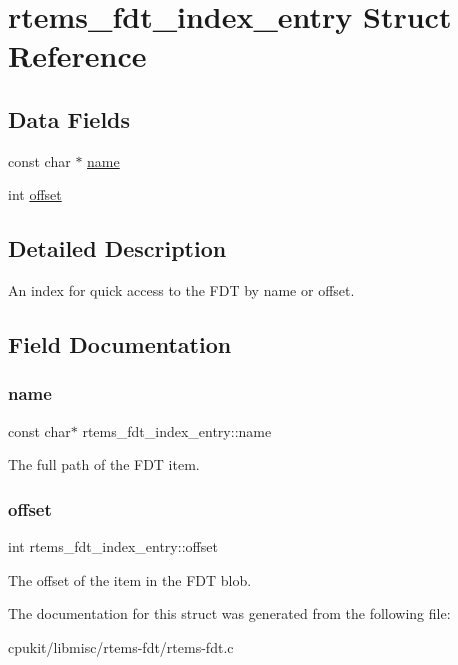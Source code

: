 \hypertarget{structrtems__fdt__index__entry}{}\section{rtems\+\_\+fdt\+\_\+index\+\_\+entry Struct Reference}
\label{structrtems__fdt__index__entry}
\subsection*{Data Fields}
\begin{DoxyCompactItemize}
\item 
const char $\ast$ \mbox{\hyperlink{structrtems__fdt__index__entry_a1febee4df5f0bf2de0d8f98c30c1e66d}{name}}
\item 
int \mbox{\hyperlink{structrtems__fdt__index__entry_af157b09672630f5f87007a166f9fbcb3}{offset}}
\end{DoxyCompactItemize}


\subsection{Detailed Description}
An index for quick access to the F\+DT by name or offset. 

\subsection{Field Documentation}
\mbox{\label{structrtems__fdt__index__entry_a1febee4df5f0bf2de0d8f98c30c1e66d}} 
\subsubsection{\texorpdfstring{name}{name}}
{\footnotesize\ttfamily const char$\ast$ rtems\+\_\+fdt\+\_\+index\+\_\+entry\+::name}

The full path of the F\+DT item. \mbox{\label{structrtems__fdt__index__entry_af157b09672630f5f87007a166f9fbcb3}} 
\subsubsection{\texorpdfstring{offset}{offset}}
{\footnotesize\ttfamily int rtems\+\_\+fdt\+\_\+index\+\_\+entry\+::offset}

The offset of the item in the F\+DT blob. 

The documentation for this struct was generated from the following file\+:\begin{DoxyCompactItemize}
\item 
cpukit/libmisc/rtems-\/fdt/rtems-\/fdt.\+c\end{DoxyCompactItemize}
